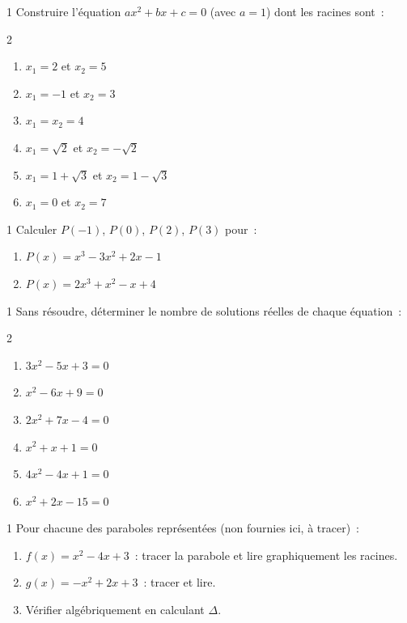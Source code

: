 \begin{exo}{1}
Construire l'\'equation $ax^2+bx+c=0$ (avec $a=1$) dont les racines sont~:
\begin{multicols}{2}
\begin{enumerate}
  \item $x_1=2$ et $x_2=5$
  \item $x_1=-1$ et $x_2=3$
  \item $x_1 = x_2 = 4$
  \item $x_1=\sqrt{2}$ et $x_2=-\sqrt{2}$
  \item $x_1=1+\sqrt{3}$ et $x_2=1-\sqrt{3}$
  \item $x_1=0$ et $x_2=7$
\end{enumerate}
\end{multicols}
\end{exo}

\begin{exo}{1}
Calculer $P(-1)$, $P(0)$, $P(2)$, $P(3)$ pour~:
\begin{enumerate}
  \item $P(x) = x^3 - 3x^2 + 2x - 1$
  \item $P(x) = 2x^3 + x^2 - x + 4$
\end{enumerate}
\end{exo}

\begin{exo}{1}
Sans r\'esoudre, d\'eterminer le nombre de solutions r\'eelles de chaque \'equation~:
\begin{multicols}{2}
\begin{enumerate}
  \item $3x^2 - 5x + 3 = 0$
  \item $x^2 - 6x + 9 = 0$
  \item $2x^2 + 7x - 4 = 0$
  \item $x^2 + x + 1 = 0$
  \item $4x^2 - 4x + 1 = 0$
  \item $x^2 + 2x - 15 = 0$
\end{enumerate}
\end{multicols}
\end{exo}

\begin{exo}{1}
Pour chacune des paraboles repr\'esent\'ees (non fournies ici, \`a tracer)~:
\begin{enumerate}
  \item $f(x) = x^2 - 4x + 3$~: tracer la parabole et lire graphiquement les racines.
  \item $g(x) = -x^2 + 2x + 3$~: tracer et lire.
  \item V\'erifier alg\'ebriquement en calculant $\Delta$.
\end{enumerate}
\end{exo}

